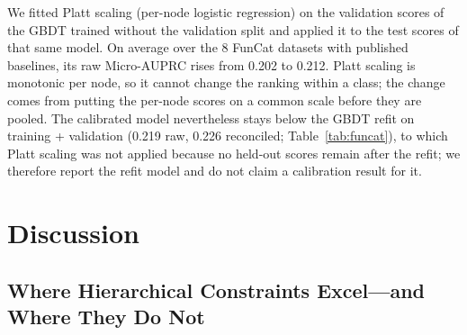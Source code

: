 \documentclass[preprint,12pt]{elsarticle}
\begin{document}
We fitted Platt scaling (per-node logistic regression) on the validation
scores of the GBDT trained without the validation split and applied it to the
test scores of that same model.  On average over the 8 FunCat datasets with
published baselines, its raw Micro-AUPRC rises from 0.202 to 0.212.  Platt
scaling is monotonic per node, so it cannot change the ranking within a
class; the change comes from putting the per-node scores on a common scale
before they are pooled.  The calibrated model nevertheless stays below the
GBDT refit on training + validation (0.219 raw, 0.226 reconciled;
Table~\ref{tab:funcat}), to which Platt scaling was not applied because no
held-out scores remain after the refit; we therefore report the refit model
and do not claim a calibration result for it.

\section{Discussion}
\label{sec:discussion}

\subsection{Where Hierarchical Constraints Excel---and Where They Do Not}
\end{document}
